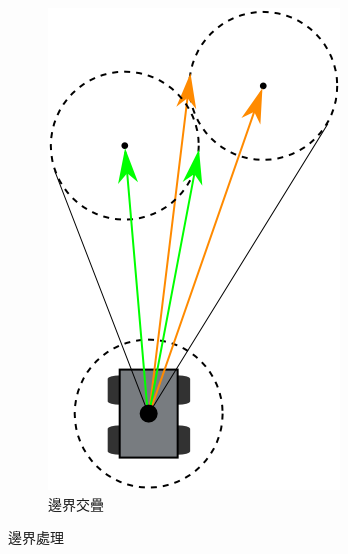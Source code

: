 \begin{figure}[h!]
\begin{subfigure}[t]{0.32\textwidth}
		\includegraphics[width=\textwidth]{figures/width_overlapped}
		\caption{邊界交疊}
		\label{f:width_overlapped}
	\end{subfigure}
	\caption{邊界處理}
\end{figure}

